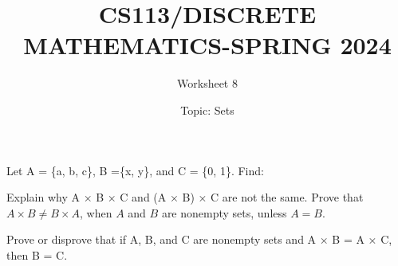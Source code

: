 \documentclass{exam}
\title{CS113/DISCRETE MATHEMATICS-SPRING 2024}
\author{Worksheet 8}
\date{Topic: Sets}
\begin{document}
\maketitle

\begin{center}
\end{center}

\vspace{5mm}

\vspace{5mm}


\vspace{5mm}



\begin{questions}


\question Let A = \{a, b, c\}, B =\{x, y\}, and C = \{0, 1\}. Find:



\question Explain why A × B × C and (A × B) × C are not the same.
\vspace{9in}
\question Prove that $A \times B \neq B \times A$, when $A$ and $B$ are nonempty sets, unless $A = B$.

\vspace{9in}

\question Prove or disprove that if A, B, and C are nonempty sets
and A × B = A × C, then B = C.
\vspace{9in}



\end{questions}
\end{document}
